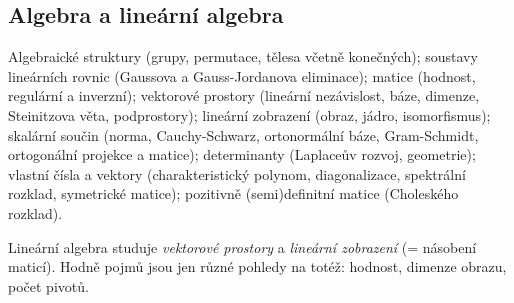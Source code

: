 \subsection{Algebra a lineární algebra}

\begin{tema}
Algebraické struktury (grupy, permutace, tělesa včetně konečných); soustavy lineárních
rovnic (Gaussova a Gauss-Jordanova eliminace); matice (hodnost, regulární a inverzní);
vektorové prostory (lineární nezávislost, báze, dimenze, Steinitzova věta, podprostory);
lineární zobrazení (obraz, jádro, isomorfismus); skalární součin (norma, Cauchy-Schwarz,
ortonormální báze, Gram-Schmidt, ortogonální projekce a matice); determinanty (Laplaceův
rozvoj, geometrie); vlastní čísla a vektory (charakteristický polynom, diagonalizace,
spektrální rozklad, symetrické matice); pozitivně (semi)definitní matice (Choleského rozklad).
\end{tema}
\begin{vezkratce}
\end{vezkratce}

\ucivo
\begin{intuice}
Lineární algebra studuje \emph{vektorové prostory} a \emph{lineární zobrazení} (= násobení
maticí). Hodně pojmů jsou jen různé pohledy na totéž: hodnost, dimenze obrazu, počet pivotů.
\end{intuice}

